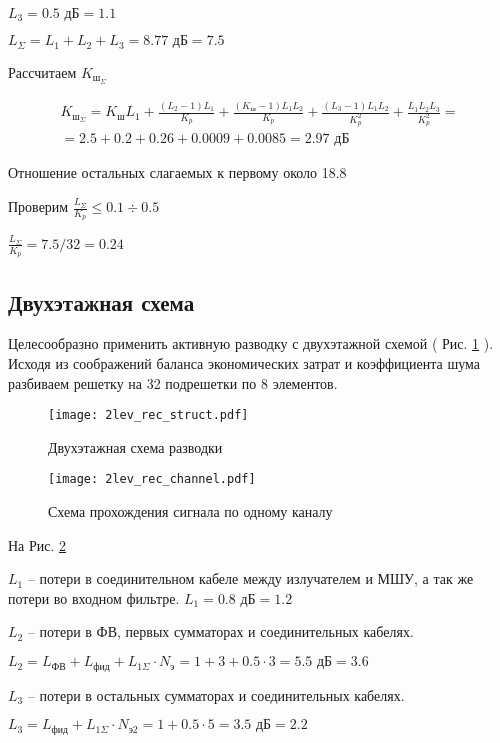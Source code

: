 $L_3=0.5 \text{ дБ}=1.1$

$L_\Sigma=L_1+L_2+L_3=8.77 \text{ дБ}=7.5$

Рассчитаем $K_{\text{ш}_\Sigma}$

\begin{multline*} \displaystyle K_{\text{ш}_\Sigma}=K_\text{ш}L_1+\frac{(L_2-1)L_1}{K_p}+\frac{(K_\text{ш}-1)L_1L_2}{K_p}+\frac{(L_3-1)L_1L_2}{K^2_p}+\frac{L_1L_2L_3}{K^2_p}=\\=2.5+0.2+0.26+0.0009+0.0085=2.97 \text{ дБ}\end{multline*}

Отношение остальных слагаемых к первому около 18.8%

Проверим $\displaystyle \frac{L_\Sigma}{K_p}\leq 0.1\div0.5$

 $\displaystyle \frac{L_\Sigma}{K_p}=7.5/32=0.24$
 
 \subsection{Двухэтажная схема}
 Целесообразно применить активную разводку с двухэтажной схемой ( Рис. \ref{fig:2lev_rec_struct} ). Исходя из соображений баланса экономических затрат и коэффициента шума разбиваем решетку на 32 подрешетки по 8 элементов.
 
 \begin{figure}[H]
 	\centering
 	\texttt{[image: 2lev\_rec\_struct.pdf]}
 	\caption{Двухэтажная схема разводки}
 	\label{fig:2lev_rec_struct}
 \end{figure}

\begin{figure}[H]
	\centering
	\texttt{[image: 2lev\_rec\_channel.pdf]}
	\caption{Схема прохождения сигнала по одному каналу}
	\label{fig:2lev_rec_channel}
\end{figure}

На Рис. \ref{fig:2lev_rec_channel} 

$L_1$ -- потери в соединительном кабеле между излучателем и МШУ, а так же потери во входном фильтре. $L_1=0.8\text{ дБ}=1.2$

$L_2$ -- потери в ФВ, первых сумматорах и соединительных кабелях.

$L_2=L_\text{ФВ}+L_\text{фид}+L_{1\Sigma}\cdot N_\text{э}=1+3+0.5\cdot3=5.5\text{ дБ}=3.6$

$L_3$ -- потери в остальных сумматорах и соединительных кабелях.

$L_3=L_\text{фид}+L_{1\Sigma}\cdot N_\text{э2}=1+0.5\cdot5=3.5 \text{ дБ}=2.2$

